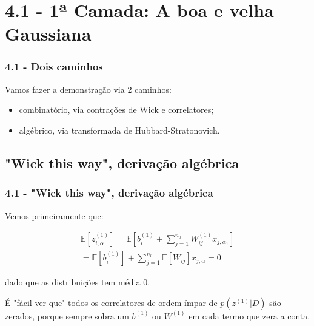 \documentclass{beamer}
\begin{document}
\section{4.1 - 1ª Camada: A boa e velha Gaussiana}    
\begin{frame}
\tableofcontents[currentsection]
\end{frame}

\begin{frame}
    \frametitle{4.1 - Dois caminhos}

    Vamos fazer a demonstração via 2 caminhos:

    \begin{itemize}
        \item combinatório, via contrações de Wick e correlatores;
        \item algébrico, via transformada de Hubbard-Stratonovich.
    \end{itemize}

\end{frame}


\subsection{"Wick this way", derivação algébrica}
\begin{frame}
\tableofcontents[currentsubsection]
\end{frame}

\begin{frame}
    \frametitle{4.1 - "Wick this way", derivação algébrica}

    Vemos primeiramente que:

    \begin{align*}
        \mathbb E[z_{i,\alpha}^{(1)}] = \mathbb E[b_i^{(1)} + \sum_{j=1}^{n_0}W_{ij}^{(1)}x_{j,\alpha_1}] \\
        = \mathbb E[b_i^{(1)}] + \sum_{j=1}^{n_0} \mathbb E[W_{ij}] x_{j,\alpha} = 0        
    \end{align*}

    dado que as distribuições tem média 0.

    É "fácil ver que" todos os correlatores de ordem ímpar de $p(z^{(1)}| D)$ são zerados, porque sempre sobra um $b^{(1)}$ ou $W^{(1)}$ em cada termo que zera a conta.

\end{frame}
\end{document}
